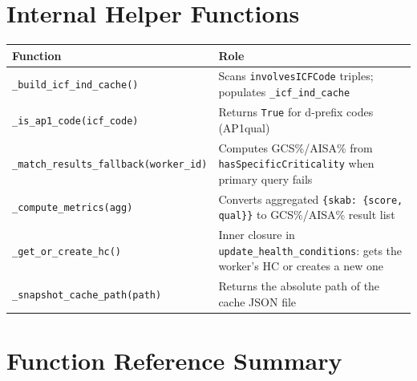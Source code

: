 ﻿\documentclass[12pt,a4paper]{article}
\begin{document}
\clearpage
\section{Internal Helper Functions}

\begin{longtable}{@{}P{5.5cm}P{9cm}@{}}
\toprule
\textbf{Function} & \textbf{Role} \\
\midrule
\endhead
\texttt{\_build\_icf\_ind\_cache()} & Scans \texttt{involvesICFCode} triples; populates \texttt{\_icf\_ind\_cache} \\
\texttt{\_is\_ap1\_code(icf\_code)} & Returns \texttt{True} for d-prefix codes (AP1qual) \\
\texttt{\_match\_results\_fallback(worker\_id)} & Computes GCS\%/AISA\% from \texttt{hasSpecificCriticality} when primary query fails \\
\texttt{\_compute\_metrics(agg)} & Converts aggregated \texttt{\{skab: \{score, qual\}\}} to GCS\%/AISA\% result list \\
\texttt{\_get\_or\_create\_hc()} & Inner closure in \texttt{update\_health\_conditions}: gets the worker's HC or creates a new one \\
\texttt{\_snapshot\_cache\_path(path)} & Returns the absolute path of the cache JSON file \\
\bottomrule
\end{longtable}

\clearpage
\section{Function Reference Summary}
\end{document}
